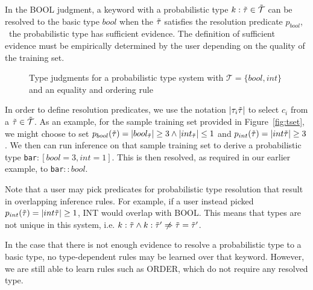 In the {\scriptsize BOOL} judgment, a keyword with a probabilistic type $k : \tilde{\tau} \in \tilde{\mathcal{T}}$ can be resolved to the basic type $bool$ when the $\tilde{\tau}$ satisfies the resolution predicate $p_{bool}$, \ie\ the probabilistic type has sufficient evidence.
The definition of sufficient evidence must be empirically determined by the user depending on the quality of the training set.

{
\setlength{\abovecaptionskip}{-.05pt}
\setlength{\belowcaptionskip}{-15pt}
\begin{figure}
\caption{Type judgments for a probabilistic type system with $\mathcal{T} = \{bool,int\}$ and an equality and ordering rule}
\label{fig:ptypes}
\end{figure}
}

In order to define resolution predicates, we use the notation $|\tau_i\tilde{\tau}|$ to select $c_i$ from a $\tilde{\tau} \in \tilde{\mathcal{T}}$.
As an example, for the sample training set provided in Figure~\ref{fig:tset}, we might choose to set $p_{bool}(\tilde{\tau})= |bool_{\tilde{\tau}}| \geq 3 \land |int_{\tilde{\tau}}| \leq 1$ and $p_{int}(\tilde{\tau})= |int\tilde{\tau}| \geq 3$.
We then can run inference on that sample training set to derive a probabilistic type \texttt{bar}$:[bool=3,int=1]$.
This is then resolved, as required in our earlier example, to \texttt{bar}$::bool$.
 
Note that a user may pick predicates for probabilistic type resolution that result in overlapping inference rules.
For example, if a user instead picked $p_{int}(\tilde{\tau})= |int\tilde{\tau}| \geq 1$, {\scriptsize INT} would overlap with {\scriptsize BOOL}.
This means that types are not unique in this system, i.e. $k:\ptype \land k:\ptype' \centernot\implies \ptype = \ptype'$.

In the case that there is not enough evidence to resolve a probabilistic type to a basic type, no type-dependent rules may be learned over that keyword.
However, we are still able to learn rules such as {\scriptsize ORDER}, which do not require any resolved type. 



